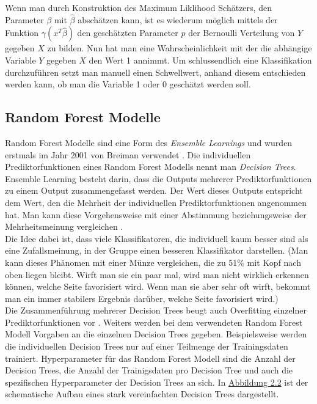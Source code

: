 Wenn man durch Konstruktion des Maximum Liklihood Sch\"atzers, den Parameter $\beta$ mit $\hat{\beta}$ absch\"atzen kann, ist es wiederum m\"oglich mittels der Funktion $\gamma(x^T\hat{\beta})$
den gesch\"atzten Parameter $\hat{p}$ der Bernoulli Verteilung von $Y$ gegeben $X$ zu bilden. Nun hat man eine Wahrscheinlichkeit mit der die abh\"angige Variable $Y$ gegeben $X$ den Wert 1 annimmt.
Um schlussendlich eine Klassifikation durchzuf\"uhren setzt man manuell einen Schwellwert, anhand diesem entschieden werden kann, ob man die Variable 1 oder 0 gesch\"atzt werden soll. 
























\subsection{Random Forest Modelle}
Random Forest Modelle sind eine Form des \textit{Ensemble Learnings} und wurden erstmals im Jahr 2001 von Breiman verwendet \cite{breiman2001random}. 
Die individuellen Prediktorfunktionen eines Random 
Forest Modells nennt man \textit{Decision Trees}.
Ensemble Learning besteht darin, dass die Outputs mehrerer Prediktorfunktionen zu einem Output zusammengefasst werden. Der Wert dieses Outputs entspricht
dem Wert, den die Mehrheit der individuellen Prediktorfunktionen angenommen hat.
Man kann diese Vorgehensweise mit einer Abstimmung beziehungsweise der Mehrheitsmeinung vergleichen \cite{handson}. \\

Die Idee dabei ist, dass viele Klassifikatoren, die individuell kaum besser sind als eine Zufallsmeinung, in der Gruppe einen 
besseren Klassifikator darstellen. (Man kann dieses Ph\"anomen mit einer M\"unze vergleichen, die zu $51\%$ mit Kopf nach oben liegen bleibt. Wirft 
man sie ein paar mal, wird man nicht wirklich erkennen k\"onnen, welche Seite favorisiert wird. Wenn man sie aber sehr oft wirft, bekommt man 
ein immer stabilers Ergebnis dar\"uber, welche Seite favorisiert wird.) \\

Die Zusammenf\"uhrung mehrerer Decision Trees beugt auch Overfitting einzelner Prediktorfunktionen vor \cite{shalev}. Weiters 
werden bei dem verwendeten Random Forest Modell Vorgaben an die einzelnen 
Decision Trees gegeben. Beispielsweise werden die individuellen Decision Trees nur auf einer Teilmenge der Trainingsdaten trainiert. Hyperparameter f\"ur das Random Forest Modell sind 
die Anzahl der Decision Trees, die Anzahl der Trainigsdaten pro Decision Tree und auch die spezifischen Hyperparameter der Decision Trees an sich. In \hyperref[fig:rf1]{Abbildung 2.2} ist der schematische Aufbau 
eines stark vereinfachten Decision Trees dargestellt. \\

